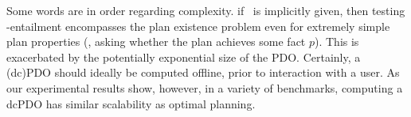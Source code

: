 Some words are in order regarding complexity. if \plans\ is implicitly
given, then testing \plans-entailment encompasses the plan existence
problem even for extremely simple plan properties (\eg, asking whether
the plan achieves some fact $p$). This is exacerbated by the
potentially exponential size of the PDO. Certainly, a (dc)PDO should
ideally be computed offline, prior to interaction with a user. As our
experimental results show, however, in a variety of benchmarks,
computing a dcPDO has similar scalability as optimal planning.
%
%


